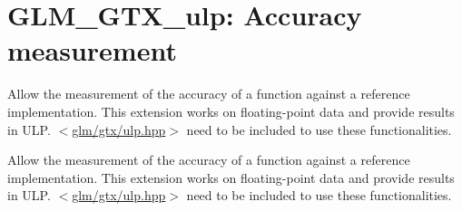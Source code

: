 \hypertarget{group__gtx__ulp}{\section{\-G\-L\-M\-\_\-\-G\-T\-X\-\_\-ulp\-: \-Accuracy measurement}
\label{group__gtx__ulp}
}


\-Allow the measurement of the accuracy of a function against a reference implementation. \-This extension works on floating-\/point data and provide results in \-U\-L\-P. $<$\hyperlink{ulp_8hpp}{glm/gtx/ulp.\-hpp}$>$ need to be included to use these functionalities.  


\-Allow the measurement of the accuracy of a function against a reference implementation. \-This extension works on floating-\/point data and provide results in \-U\-L\-P. $<$\hyperlink{ulp_8hpp}{glm/gtx/ulp.\-hpp}$>$ need to be included to use these functionalities. 